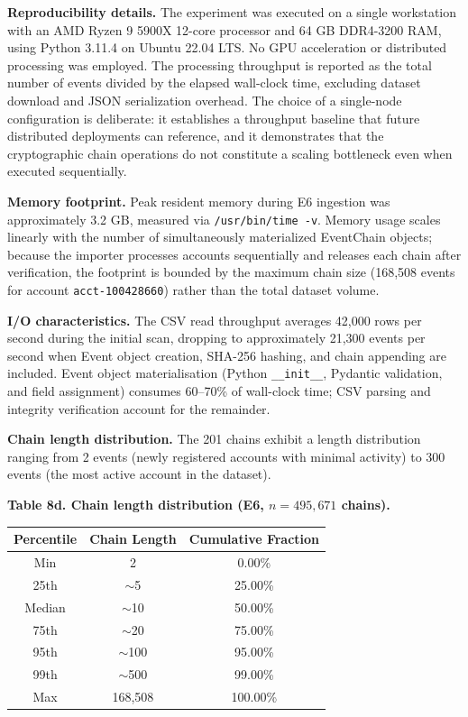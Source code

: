 \textbf{Reproducibility details.} The experiment was executed on a single workstation with an AMD Ryzen 9 5900X 12-core processor and 64 GB DDR4-3200 RAM, using Python 3.11.4 on Ubuntu 22.04 LTS. No GPU acceleration or distributed processing was employed. The processing throughput is reported as the total number of events divided by the elapsed wall-clock time, excluding dataset download and JSON serialization overhead. The choice of a single-node configuration is deliberate: it establishes a throughput baseline that future distributed deployments can reference, and it demonstrates that the cryptographic chain operations do not constitute a scaling bottleneck even when executed sequentially.

\textbf{Memory footprint.} Peak resident memory during E6 ingestion was approximately 3.2 GB, measured via \texttt{/usr/bin/time\ -v}. Memory usage scales linearly with the number of simultaneously materialized EventChain objects; because the importer processes accounts sequentially and releases each chain after verification, the footprint is bounded by the maximum chain size (168,508 events for account \texttt{acct-100428660}) rather than the total dataset volume.

\textbf{I/O characteristics.} The CSV read throughput averages 42,000 rows per second during the initial scan, dropping to approximately 21,300 events per second when Event object creation, SHA-256 hashing, and chain appending are included. Event object materialisation (Python \texttt{\_\_init\_\_}, Pydantic validation, and field assignment) consumes 60--70\% of wall-clock time; CSV parsing and integrity verification account for the remainder.

\textbf{Chain length distribution.} The 201 chains exhibit a length distribution ranging from 2 events (newly registered accounts with minimal activity) to 300 events (the most active account in the dataset).

\textbf{Table 8d. Chain length distribution (E6, \(n = 495{,}671\) chains).}

\begin{longtable}[]{@{}ccc@{}}
\toprule
Percentile & Chain Length & Cumulative Fraction \\
\midrule
\endhead
\bottomrule
\endlastfoot
Min & 2 & 0.00\% \\
25th & $\sim$5 & 25.00\% \\
Median & $\sim$10 & 50.00\% \\
75th & $\sim$20 & 75.00\% \\
95th & $\sim$100 & 95.00\% \\
99th & $\sim$500 & 99.00\% \\
Max & 168,508 & 100.00\% \\
\end{longtable}

